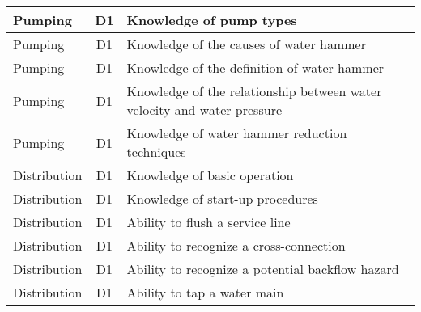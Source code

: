 \documentclass{article}
\begin{document}
\begin{table}[]
\begin{tabular}{|l|c|l|}
Pumping                                & D1             & Knowledge of pump   types                                                                                                         \\ \hline
Pumping                                & D1             & Knowledge of the   causes of water hammer                                                                                         \\ \hline
Pumping                                & D1             & Knowledge of the   definition of water hammer                                                                                     \\ \hline
Pumping                                & D1             & Knowledge of the   relationship between water velocity and water pressure                                                         \\ \hline
Pumping                                & D1             & Knowledge of water   hammer reduction techniques                                                                                  \\ \hline
Distribution                           & D1             & Knowledge of basic   operation                                                                                                    \\ \hline
Distribution                           & D1             & Knowledge of start-up   procedures                                                                                                \\ \hline
Distribution                           & D1             & Ability to flush a   service line                                                                                                 \\ \hline
Distribution                           & D1             & Ability to recognize   a cross-connection                                                                                         \\ \hline
Distribution                           & D1             & Ability to recognize   a potential backflow hazard                                                                                \\ \hline
Distribution                           & D1             & Ability to tap a   water main                                                                                                     \\ \hline

\end{tabular}
\end{table}
\end{document}
